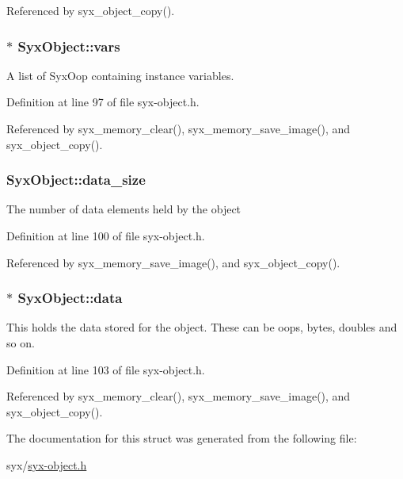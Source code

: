Referenced by syx\_\-object\_\-copy().\hypertarget{struct_syx_object_6f4addae6397d0901b4df39bc69621f9}{
\subsubsection{$\ast$ {\bf SyxObject::vars}}}
\label{struct_syx_object_6f4addae6397d0901b4df39bc69621f9}


A list of SyxOop containing instance variables. 

Definition at line 97 of file syx-object.h.

Referenced by syx\_\-memory\_\-clear(), syx\_\-memory\_\-save\_\-image(), and syx\_\-object\_\-copy().\hypertarget{struct_syx_object_9bde6747e06b47579dc52aa1c1bc878d}{
\subsubsection{ {\bf SyxObject::data\_\-size}}}
\label{struct_syx_object_9bde6747e06b47579dc52aa1c1bc878d}


The number of data elements held by the object 

Definition at line 100 of file syx-object.h.

Referenced by syx\_\-memory\_\-save\_\-image(), and syx\_\-object\_\-copy().\hypertarget{struct_syx_object_1613092e651dd77e4a0c1d0a1ec413cb}{
\subsubsection{$\ast$ {\bf SyxObject::data}}}
\label{struct_syx_object_1613092e651dd77e4a0c1d0a1ec413cb}


This holds the data stored for the object. These can be oops, bytes, doubles and so on. 

Definition at line 103 of file syx-object.h.

Referenced by syx\_\-memory\_\-clear(), syx\_\-memory\_\-save\_\-image(), and syx\_\-object\_\-copy().

The documentation for this struct was generated from the following file:\begin{CompactItemize}
\item 
syx/\hyperlink{syx-object_8h}{syx-object.h}\end{CompactItemize}
